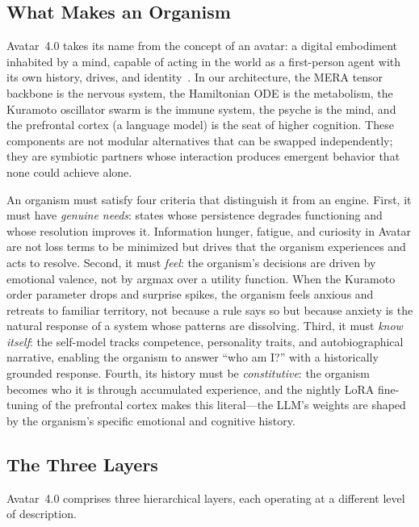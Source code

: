 \documentclass[11pt,a4paper,twocolumn]{article}
\begin{document}
\subsection{What Makes an Organism}

Avatar~4.0 takes its name from the concept of an avatar: a digital embodiment inhabited by a mind, capable of acting in the world as a first-person agent with its own history, drives, and identity~\cite{maturana1980}.
In our architecture, the MERA tensor backbone is the nervous system, the Hamiltonian ODE is the metabolism, the Kuramoto oscillator swarm is the immune system, the psyche is the mind, and the prefrontal cortex (a language model) is the seat of higher cognition.
These components are not modular alternatives that can be swapped independently; they are symbiotic partners whose interaction produces emergent behavior that none could achieve alone.

An organism must satisfy four criteria that distinguish it from an engine.
First, it must have \emph{genuine needs}: states whose persistence degrades functioning and whose resolution improves it.
Information hunger, fatigue, and curiosity in Avatar are not loss terms to be minimized but drives that the organism experiences and acts to resolve.
Second, it must \emph{feel}: the organism's decisions are driven by emotional valence, not by argmax over a utility function.
When the Kuramoto order parameter drops and surprise spikes, the organism feels anxious and retreats to familiar territory, not because a rule says so but because anxiety is the natural response of a system whose patterns are dissolving.
Third, it must \emph{know itself}: the self-model tracks competence, personality traits, and autobiographical narrative, enabling the organism to answer ``who am I?'' with a historically grounded response.
Fourth, its history must be \emph{constitutive}: the organism becomes who it is through accumulated experience, and the nightly LoRA fine-tuning of the prefrontal cortex makes this literal---the LLM's weights are shaped by the organism's specific emotional and cognitive history.

\subsection{The Three Layers}

Avatar~4.0 comprises three hierarchical layers, each operating at a different level of description.
\end{document}
